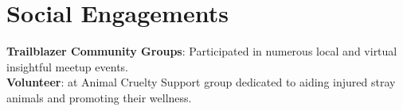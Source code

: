 \section{Social Engagements}
\begin{itemize}
\small{\item{
\textbf{Trailblazer Community Groups}{: Participated in numerous local and virtual insightful meetup events.}\\
\textbf{Volunteer}{: at Animal Cruelty Support group dedicated to aiding injured stray animals and promoting their wellness.}}}
\end{itemize}